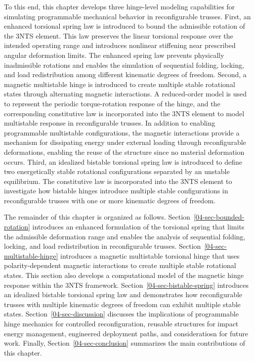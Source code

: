 To this end, this chapter develops three hinge-level modeling capabilities for simulating programmable mechanical behavior in reconfigurable trusses. First, an enhanced torsional spring law is introduced to bound the admissible rotation of the 3NTS element. This law preserves the linear torsional response over the intended operating range and introduces nonlinear stiffening near prescribed angular deformation limits. The enhanced spring law prevents physically inadmissible rotations and enables the simulation of sequential folding, locking, and load redistribution among different kinematic degrees of freedom. Second, a magnetic multistable hinge is introduced to create multiple stable rotational states through alternating magnetic interactions. A reduced-order model is used to represent the periodic torque-rotation response of the hinge, and the corresponding constitutive law is incorporated into the 3NTS element to model multistable response in reconfigurable trusses.  In addition to enabling programmable multistable configurations, the magnetic interactions provide a mechanism for dissipating energy under external loading through reconfigurable deformations, enabling the reuse of the structure since no material deformation occurs. Third, an idealized bistable torsional spring law is introduced to define two energetically stable rotational configurations separated by an unstable equilibrium. The constitutive law is incorporated into the 3NTS element to investigate how bistable hinges introduce multiple stable configurations in reconfigurable trusses with one or more kinematic degrees of freedom.

The remainder of this chapter is organized as follows. Section~\ref{04-sec-bounded-rotation} introduces an enhanced formulation of the torsional spring that limits the admissible deformation range and enables the analysis of sequential folding, locking, and load redistribution in reconfigurable trusses. Section~\ref{04-sec-multistable-hinge} introduces a magnetic multistable torsional hinge that uses polarity-dependent magnetic interactions to create multiple stable rotational states. This section also develops a computational model of the magnetic hinge response within the 3NTS framework. Section~\ref{04-sec-bistable-spring} introduces an idealized bistable torsional spring law and demonstrates how reconfigurable trusses with multiple kinematic degrees of freedom can exhibit multiple stable states. Section~\ref{04-sec-discussion} discusses the implications of programmable hinge mechanics for controlled reconfiguration, reusable structures for impact energy management, engineered deployment paths, and consideratiosn for future work. Finally, Section~\ref{04-sec-conclusion} summarizes the main contributions of this chapter.

